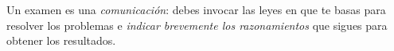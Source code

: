 \documentclass[a4paper,14pt]{exam}
\newcommand*\chem[1]{\ensuremath{\mathrm{#1}}}
\begin{document}
	

\vspace*{1cm}

\begin{minipage}{.07\linewidth}

\end{minipage}\hfill
\begin{minipage}{.93\linewidth}
\begin{problemas}{Un examen es una \textit{comunicación}: debes invocar las leyes en que te basas para resolver los problemas e \textit{indicar brevemente los razonamientos} que sigues para obtener los resultados.}
\end{problemas}
\end{minipage}

\vspace{1ex}




\newpage
	
\end{document}
